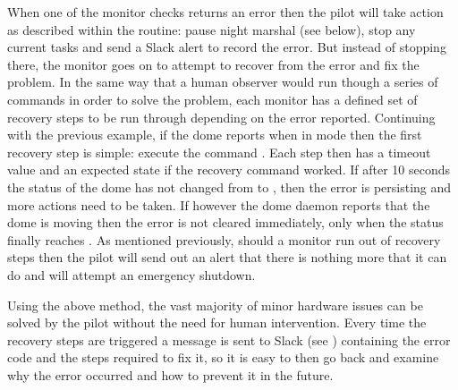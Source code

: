 \begin{colsection}
When one of the monitor checks returns an error then the pilot will take action as described within the  routine: pause night marshal (see below), stop any current tasks and send a Slack alert to record the error. But instead of stopping there, the monitor goes on to attempt to recover from the error and fix the problem. In the same way that a human observer would run though a series of commands in order to solve the problem, each monitor has a defined set of recovery steps to be run through depending on the error reported. Continuing with the previous example, if the dome reports  when in  mode then the first recovery step is simple: execute the command . Each step then has a timeout value and an expected state if the recovery command worked. If after 10 seconds the status of the dome has not changed from  to , then the error is persisting and more actions need to be taken. If however the dome daemon reports that the dome is moving then the error is not cleared immediately, only when the status finally reaches . As mentioned previously, should a monitor run out of recovery steps then the pilot will send out an alert that there is nothing more that it can do and will attempt an emergency shutdown.

Using the above method, the vast majority of minor hardware issues can be solved by the pilot without the need for human intervention. Every time the recovery steps are triggered a message is sent to Slack (see ) containing the error code and the steps required to fix it, so it is easy to then go back and examine why the error occurred and how to prevent it in the future.

\newpage

\end{colsection}


